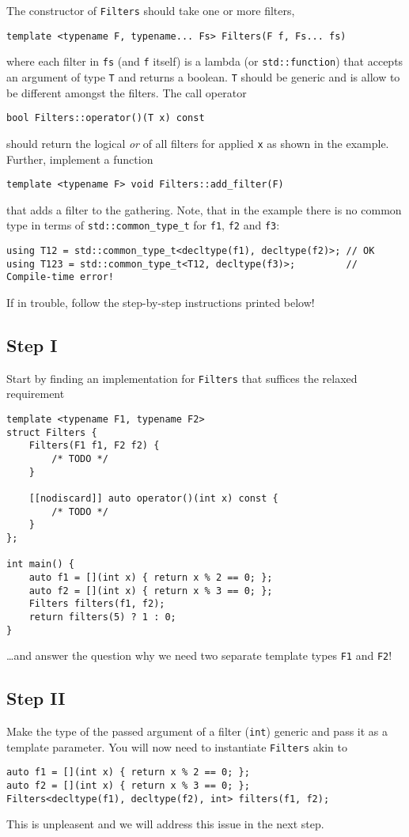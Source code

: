 \documentclass{scrartcl}
\begin{document}
The constructor of \texttt{Filters} should take one or more filters,
\begin{lstlisting}
template <typename F, typename... Fs> Filters(F f, Fs... fs)
\end{lstlisting}
where each filter in \texttt{fs} (and \texttt{f} itself) is a lambda (or \texttt{std::function}) that accepts an argument of type \texttt{T} and returns a boolean. \texttt{T} should be generic and is allow to be different amongst the filters.
The call operator 
\begin{lstlisting}
bool Filters::operator()(T x) const
\end{lstlisting}
should return the logical \textit{or} of all filters for applied \texttt{x} as shown in the example.
Further, implement a function
\begin{lstlisting}
template <typename F> void Filters::add_filter(F)
\end{lstlisting}
that adds a filter to the gathering. Note, that in the example there is no common type in terms of \texttt{std::common\_type\_t} for \texttt{f1}, \texttt{f2} and \texttt{f3}:
\begin{lstlisting}
using T12 = std::common_type_t<decltype(f1), decltype(f2)>; // OK
using T123 = std::common_type_t<T12, decltype(f3)>;         // Compile-time error!
\end{lstlisting}

If in trouble, follow the step-by-step instructions printed below!

\subsection{Step I}
Start by finding an implementation for \texttt{Filters} that suffices the relaxed requirement
\begin{lstlisting}
template <typename F1, typename F2>
struct Filters {
    Filters(F1 f1, F2 f2) {
        /* TODO */
    }

    [[nodiscard]] auto operator()(int x) const {
        /* TODO */
    }
};

int main() {
    auto f1 = [](int x) { return x % 2 == 0; };
    auto f2 = [](int x) { return x % 3 == 0; };
    Filters filters(f1, f2);
    return filters(5) ? 1 : 0;
}
\end{lstlisting}
\ldots and answer the question why we need two separate template types \texttt{F1} and \texttt{F2}!

\subsection{Step II}
Make the type of the passed argument of a filter (\texttt{int}) generic and pass it as a template parameter. You will now need to instantiate \texttt{Filters} akin to
\begin{lstlisting}
auto f1 = [](int x) { return x % 2 == 0; };
auto f2 = [](int x) { return x % 3 == 0; };
Filters<decltype(f1), decltype(f2), int> filters(f1, f2);
\end{lstlisting}
This is unpleasent and we will address this issue in the next step.
\end{document}

